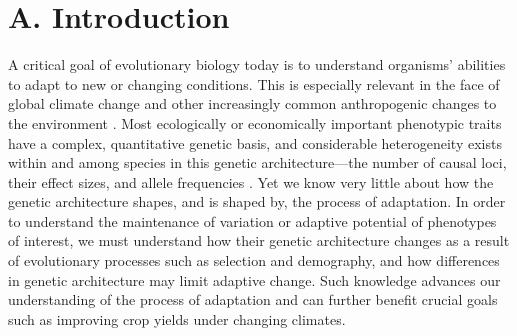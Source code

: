 




\vspace{-0.5cm}

\section*{A. Introduction}	%

A critical goal of evolutionary biology today is to understand organisms' abilities to adapt to new or changing conditions. This is especially relevant in the face of global climate change and other increasingly common anthropogenic changes to the environment \citep{Easterling:2000ja}. Most ecologically or economically important phenotypic traits have a complex, quantitative genetic basis, and considerable heterogeneity exists within and among species in this genetic architecture---the number of causal loci, their effect sizes, and allele frequencies \citep{orr:2001, slate:2005}. Yet we know very little about how the genetic architecture shapes, and is shaped by, the process of adaptation. In order to understand the maintenance of variation or adaptive potential of phenotypes of interest, we must understand how their genetic architecture changes as a result of evolutionary processes such as selection and demography, and how differences in genetic architecture may limit adaptive change. Such knowledge advances our understanding of the process of adaptation and can further benefit crucial goals such as improving crop yields under changing climates. 

